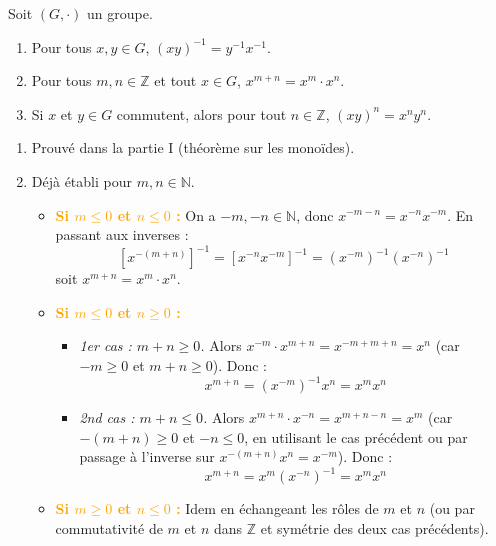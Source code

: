 \documentclass[a4paper,11pt]{article}
\newcommand{\N}{\mathbb{N}}
\newcommand{\Z}{\mathbb{Z}}
\newcommand{\cas}[1]{\textbf{\textcolor{orange}{#1}}}
\begin{document}
\begin{proposition}
Soit $(G, \cdot)$ un groupe.
\begin{enumerate}
    \item Pour tous $x, y \in G$, $(xy)^{-1} = y^{-1} x^{-1}$.
    \item Pour tous $m, n \in \Z$ et tout $x \in G$, $x^{m+n} = x^m \cdot x^n$.
    \item Si $x$ et $y \in G$ commutent, alors pour tout $n \in \Z$, $(xy)^n = x^n y^n$.
\end{enumerate}
\end{proposition}

\begin{demonstration}
\begin{enumerate}
    \item Prouvé dans la partie I (théorème sur les monoïdes).
    
    \item Déjà établi pour $m, n \in \N$.
    \begin{itemize}
        \item \cas{Si $m \le 0$ et $n \le 0$ :} On a $-m, -n \in \N$, donc $x^{-m-n} = x^{-n} x^{-m}$. En passant aux inverses :
        \[
        \left[ x^{-(m+n)} \right]^{-1} = \left[ x^{-n} x^{-m} \right]^{-1} = (x^{-m})^{-1} (x^{-n})^{-1}
        \]
        soit $x^{m+n} = x^m \cdot x^n$.
        
        \item \cas{Si $m \le 0$ et $n \ge 0$ :}
        \begin{itemize}
            \item \textit{1er cas : $m + n \ge 0$.} Alors $x^{-m} \cdot x^{m+n} = x^{-m + m + n} = x^n$ (car $-m \ge 0$ et $m+n \ge 0$). Donc :
            \[
            x^{m+n} = (x^{-m})^{-1} x^n = x^m x^n
            \]
            \item \textit{2nd cas : $m + n \le 0$.} Alors $x^{m+n} \cdot x^{-n} = x^{m + n - n} = x^m$ (car $-(m+n) \ge 0$ et $-n \le 0$, en utilisant le cas précédent ou par passage à l'inverse sur $x^{-(m+n)} x^n = x^{-m}$). Donc :
            \[
            x^{m+n} = x^m (x^{-n})^{-1} = x^m x^n
            \]
        \end{itemize}
        
        \item \cas{Si $m \ge 0$ et $n \le 0$ :} Idem en échangeant les rôles de $m$ et $n$ (ou par commutativité de $m$ et $n$ dans $\Z$ et symétrie des deux cas précédents).
    \end{itemize}
    

\end{enumerate}
\end{demonstration}
\end{document}

